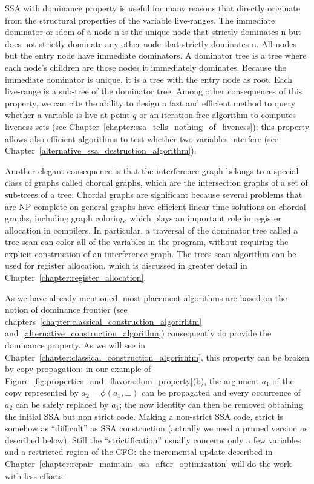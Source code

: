 SSA with dominance property is useful for many reasons that directly originate from the structural properties of the variable live-ranges. 
The immediate dominator or idom of a node n is the unique node that strictly dominates n but does not strictly dominate any other node that strictly dominates n. All nodes but the entry node have immediate dominators. A dominator tree is a tree where each node's children are those nodes it immediately dominates. Because the immediate dominator is unique, it is a tree with the entry node as root. Each live-range is a sub-tree of the dominator tree. 
Among other consequences of this property, we can cite the ability to design a fast and efficient method to query whether a variable is live at point $q$ or an iteration free algorithm to computes liveness sets (see Chapter~\ref{chapter:ssa_tells_nothing_of_liveness}); this property allows also efficient algorithms to test whether two variables interfere (see Chapter~\ref{alternative_ssa_destruction_algorithm}). 

Another elegant consequence is that the interference graph belongs to a special class of
graphs called chordal graphs, which are the intersection graphs of a set
of sub-trees of a tree. Chordal graphs are significant because several
problems that are NP-complete on general graphs have efficient linear-time
solutions on chordal graphs, including graph coloring, which plays
an important role in register allocation in compilers. In particular,
a traversal of the dominator tree called a tree-scan can color all of
the variables in the program, without requiring the explicit construction
of an interference graph. The trees-scan algorithm can be used
for register allocation, which is discussed
in greater detail in Chapter~\ref{chapter:register_allocation}. 

As we have already mentioned, most \phifun placement algorithms are based on the notion of dominance frontier (see chapters~\ref{chapter:classical_construction_algorirhtm} and~\ref{alternative_construction_algorithm}) consequently do provide the dominance property. As we will see in Chapter~\ref{chapter:classical_construction_algorirhtm}, this property can be broken by copy-propagation: in our example of Figure~\ref{fig:properties_and_flavors:dom_property}(b), the argument $a_1$ of the copy represented by $a_2=\phi(a_1,\bot)$ can be propagated and every occurrence of $a_2$ can be safely replaced by $a_1$; the now identity \phifun can then be removed obtaining the initial SSA but non strict code. Making a non-strict SSA code, strict is somehow as ``difficult'' as SSA construction (actually we need a pruned version as described below). Still the ``strictification'' usually concerns only a few variables and a restricted region of the CFG: the incremental update described in Chapter~\ref{chapter:repair_maintain_ssa_after_optimization} will do the work with less efforts.

